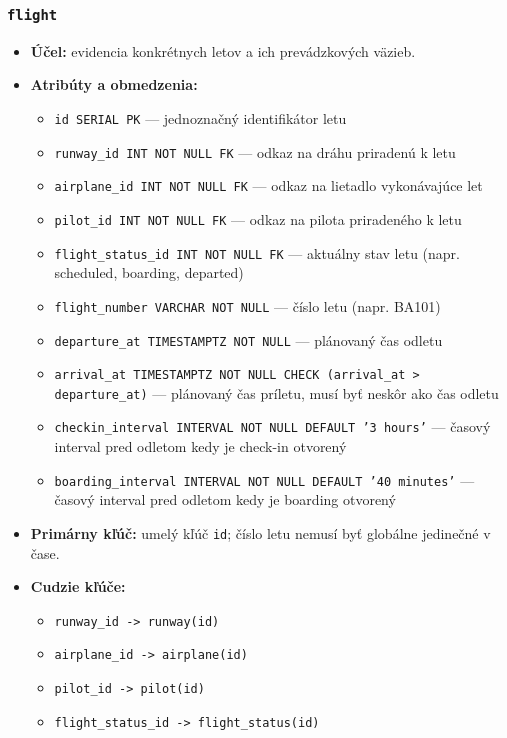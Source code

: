 \documentclass[11pt, a4paper]{article}
\begin{document}
\subsubsection*{\texttt{flight}}
\begin{itemize}
    \item \textbf{Účel:} evidencia konkrétnych letov a ich prevádzkových väzieb.
    \item \textbf{Atribúty a obmedzenia:}
    \begin{itemize}
        \item \texttt{id SERIAL PK} --- jednoznačný identifikátor letu
        \item \texttt{runway\_id INT NOT NULL FK} --- odkaz na dráhu priradenú k letu
        \item \texttt{airplane\_id INT NOT NULL FK} --- odkaz na lietadlo vykonávajúce let
        \item \texttt{pilot\_id INT NOT NULL FK} --- odkaz na pilota priradeného k letu
        \item \texttt{flight\_status\_id INT NOT NULL FK} --- aktuálny stav letu (napr. scheduled, boarding, departed)
        \item \texttt{flight\_number VARCHAR NOT NULL} --- číslo letu (napr. BA101)
        \item \texttt{departure\_at TIMESTAMPTZ NOT NULL} --- plánovaný čas odletu
        \item \texttt{arrival\_at TIMESTAMPTZ NOT NULL CHECK (arrival\_at > departure\_at)} --- plánovaný čas príletu, musí byť neskôr ako čas odletu
        \item \texttt{checkin\_interval INTERVAL NOT NULL DEFAULT '3 hours'} --- časový interval pred odletom kedy je check-in otvorený
        \item \texttt{boarding\_interval INTERVAL NOT NULL DEFAULT '40 minutes'} --- časový interval pred odletom kedy je boarding otvorený
    \end{itemize}
    \item \textbf{Primárny kľúč:} umelý kľúč \texttt{id}; číslo letu nemusí byť globálne jedinečné v čase.
    \item \textbf{Cudzie kľúče:} 
        \begin{itemize}
            \item \texttt{runway\_id -> runway(id)}
            \item \texttt{airplane\_id -> airplane(id)}
            \item \texttt{pilot\_id -> pilot(id)}
            \item \texttt{flight\_status\_id -> flight\_status(id)}
        \end{itemize}
\end{itemize}
\end{document}
